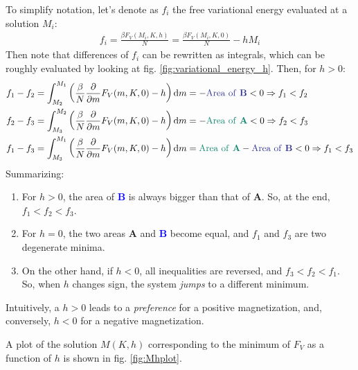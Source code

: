 \documentclass[../../main.tex]{subfiles}
\begin{document}
To simplify notation, let's denote as $f_i$ the free variational energy evaluated at a solution $M_i$:
\begin{align*}
    f_i = \frac{\beta F_V(M_i, K, h)}{N} = \frac{\beta F_V(M_i, K, 0)}{N} - hM_i  
\end{align*}
Then note that differences of $f_i$ can be rewritten as integrals, which can be roughly evaluated by looking at fig. \ref{fig:variational_energy_h}. Then, for $h > 0$:
\begin{align*}
    f_1 - f_2 &= \int_{M_2}^{M_1} \left(\frac{\beta}{N} \pdv{m} F_V(m, K, 0) - h\right) \dd{m} = -\text{\textcolor{Blue}{Area of \textbf{B}}} < 0 \Rightarrow f_1 < f_2\\
    f_2 - f_3 &= \int_{M_3}^{M_2} \left(\frac{\beta}{N} \pdv{m} F_V(m, K, 0) - h\right) \dd{m} = -\text{\textcolor{PineGreen}{Area of \textbf{A}}} < 0 \Rightarrow f_2 < f_3\\
    f_1-f_3 &= \int_{M_3}^{M_1} \left(\frac{\beta}{N} \pdv{m} F_V(m, K, 0) - h\right) \dd{m} = \text{\textcolor{PineGreen}{Area of \textbf{A}}}-\text{\textcolor{Blue}{Area of \textbf{B}}} < 0 \Rightarrow f_1 < f_3\\
\end{align*}
Summarizing:
\begin{enumerate}
    \item For $h > 0$, the area of \textbf{\textcolor{Blue}{B}} is always bigger than that of \textbf{\textcolor{PineGreen}{A}}. So, at the end, $f_1 < f_2 < f_3$.
    \item For $h = 0$, the two areas \textbf{\textcolor{PineGreen}{A}} and \textbf{\textcolor{Blue}{B}} become equal, and $f_1$ and $f_3$ are two degenerate minima. 
    \item On the other hand, if $h < 0$, all inequalities are reversed, and $f_3 < f_2 < f_1$. So, when $h$ changes sign, the system \textit{jumps} to a different minimum. 
\end{enumerate}

Intuitively, a $h > 0$ leads to a \textit{preference} for a positive magnetization, and, conversely, $h < 0$ for a negative magnetization. 

\medskip

A plot of the solution $M(K,h)$ corresponding to the minimum of $F_V$ as a function of $h$ is shown in fig. \ref{fig:Mhplot}.
\end{document}

